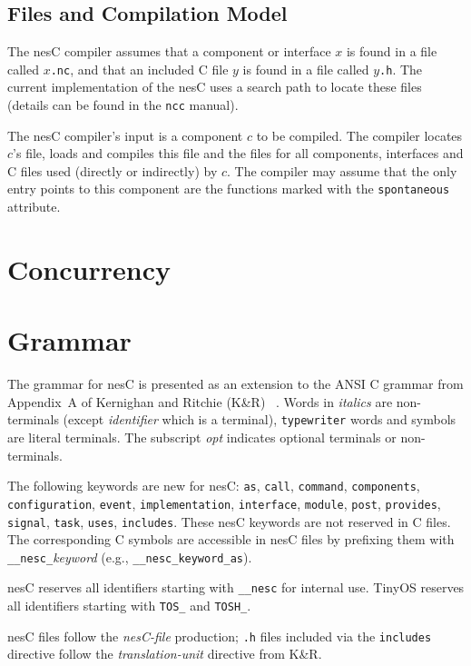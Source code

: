 \documentclass[11pt]{article}
\newcommand{\kw}[1]{{\tt #1}}
\newcommand{\code}[1]{{\tt #1}}
\newcommand{\file}[1]{{\tt #1}}
\newcommand{\nesc}{nesC\xspace}
\begin{document}
\subsection{Files and Compilation Model}
\label{sec:cmodel}

The \nesc compiler assumes that a component or interface $x$ is found
in a file called \file{$x$.nc}, and that an included C file $y$ is
found in a file called \file{$y$.h}. The current implementation of
the \nesc uses a search path to locate these files (details can be
found in the \file{ncc} manual).

The \nesc compiler's input is a component $c$ to be compiled. The compiler
locates $c$'s file, loads and compiles this file and the files for all
components, interfaces and C files used (directly or indirectly) by $c$.
The compiler may assume that the only entry points to this component
are the functions marked with the \code{spontaneous} attribute.

\section{Concurrency}
\label{sec:concurrency}

\section{Grammar}
\label{sec:grammar}

The grammar for \nesc is presented as an extension to the ANSI C grammar
from Appendix~A of Kernighan and Ritchie (K\&R)
~\cite[pp234--239]{kandr}. Words in \emph{italics} are non-terminals (except
\emph{identifier} which is a terminal), \kw{typewriter} words and symbols
are literal terminals. The subscript \emph{opt} indicates optional
terminals or non-terminals.

The following keywords are new for \nesc: \kw{as}, \kw{call}, \kw{command},
\kw{components}, \kw{configuration}, \kw{event}, \kw{implementation},
\kw{interface}, \kw{module}, \kw{post}, \kw{provides}, \kw{signal},
\kw{task}, \kw{uses}, \kw{includes}. These \nesc keywords are not reserved
in C files. The corresponding C symbols are accessible in \nesc files by
prefixing them with \kw{\_\_nesc\_}\emph{keyword} (e.g.,
\kw{\_\_nesc\_keyword\_as}).

\nesc reserves all identifiers starting with \kw{\_\_nesc} for internal
use. TinyOS reserves all identifiers starting with \kw{TOS\_} and
\kw{TOSH\_}.

\nesc files follow the \emph{nesC-file} production; \file{.h} files included
via the \kw{includes} directive follow the \emph{translation-unit}
directive from K\&R. 
\end{document}
